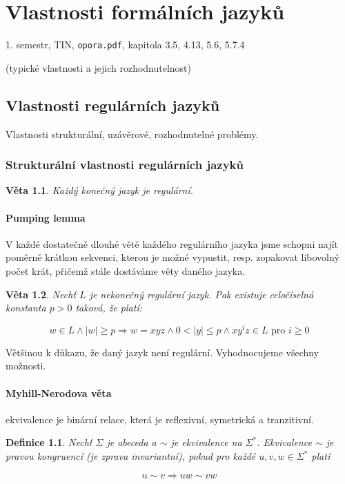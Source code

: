 \documentclass[a4paper, 11pt]{report}
\newtheorem{mydef}{Definice}[chapter]
\newtheorem{veta}{Věta}[chapter]
\begin{document}
\chapter{Vlastnosti formálních jazyků} \label{cha:17}

1. semestr, TIN, \texttt{opora.pdf}, kapitola 3.5, 4.13, 5.6, 5.7.4

(typické vlastnosti a jejich rozhodnutelnost)

\section{Vlastnosti regulárních jazyků}

Vlastnosti strukturální, uzávěrové, rozhodnutelné problémy.

\subsection{Strukturální vlastnosti regulárních jazyků}
\begin{veta}
Každý konečný jazyk je regulární.
\end{veta}

\subsubsection{Pumping lemma}
V každé dostatečně dlouhé větě každého regulárního jazyka jsme schopni najít poměrně krátkou sekvenci, kterou je možné vypustit, resp. zopakovat libovolný počet krát, přičemž stále dostáváme věty daného jazyka.

\begin{veta}
Nechť $L$ je nekonečný regulární jazyk. Pak existuje celočíselná konstanta $p > 0$ taková, že platí:

$$w \in L \land |w| \geq p \Rightarrow w = xyz \land 0 < |y| \leq p \land x y^i z \in L \text{ pro } i \geq 0$$
\end{veta}

Většinou k důkazu, že daný jazyk není regulární. Vyhodnocujeme všechny možnosti.

\subsubsection{Myhill-Nerodova věta}

ekvivalence je binární relace, která je reflexivní, symetrická a tranzitivní.

\begin{mydef}
Nechť $\Sigma$ je abeceda a $\sim$ je ekvivalence na $\Sigma^*$.
Ekvivalence $\sim$ je \emph{pravou kongruencí} (je zprava invariantní), pokud pro každé $u,v,w \in \Sigma^*$ platí

$$u \sim v \Rightarrow uw \sim vw$$
\end{mydef}
\end{document}
